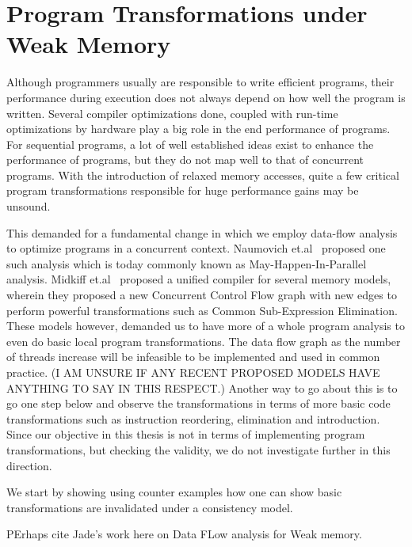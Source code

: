 \section{Program Transformations under Weak Memory}

    Although programmers usually are responsible to write efficient programs, their performance during execution does not always depend on how well the program is written. 
    Several compiler optimizations done, coupled with run-time optimizations by hardware play a big role in the end performance of programs.
    For sequential programs, a lot of well established ideas exist to enhance the performance of programs, but they do not map well to that of concurrent programs. 
    With the introduction of relaxed memory accesses, quite a few critical program transformations responsible for huge performance gains may be unsound. 

    This demanded for a fundamental change in which we employ data-flow analysis to optimize programs in a concurrent context. Naumovich et.al~\cite{NaumovichA} proposed one such analysis which is today commonly known as May-Happen-In-Parallel analysis. 
    Midkiff et.al~\cite{Midkiff} proposed a unified compiler for several memory models, wherein they proposed a new Concurrent Control Flow graph with new edges to perform powerful transformations such as Common Sub-Expression Elimination. 
    These models however, demanded us to have more of a whole program analysis to even do basic local program transformations. 
    The data flow graph as the number of threads increase will be infeasible to be implemented and used in common practice. 
    (I AM UNSURE IF ANY RECENT PROPOSED MODELS HAVE ANYTHING TO SAY IN THIS RESPECT.)
    Another way to go about this is to go one step below and observe the transformations in terms of more basic code transformations such as instruction reordering, elimination and introduction. 
    Since our objective in this thesis is not in terms of implementing program transformations, but checking the validity, we do not investigate further in this direction. 
    
    We start by showing using counter examples how one can show basic transformations are invalidated under a consistency model.

    \cite{red}{PErhaps cite Jade's work here on Data FLow analysis for Weak memory.}


